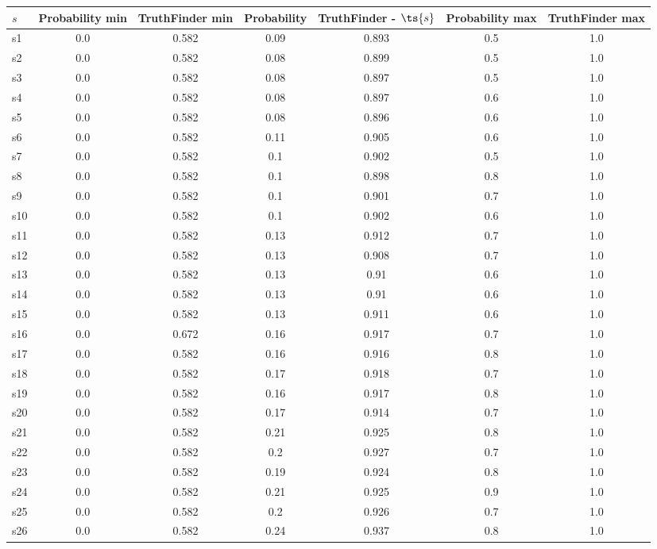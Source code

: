 \documentclass{article}
\begin{document}
\noindent\begin{tabular}{|l|c|c|c|c|c|c|}
\hline
$s$& Probability min & TruthFinder min & Probability & TruthFinder - $\ts{s}$ & Probability max & TruthFinder max\\
\hline
s1 &0.0 & 0.582 & 0.09 & 0.893 & 0.5 & 1.0\\
\hline
s2 &0.0 & 0.582 & 0.08 & 0.899 & 0.5 & 1.0\\
\hline
s3 &0.0 & 0.582 & 0.08 & 0.897 & 0.5 & 1.0\\
\hline
s4 &0.0 & 0.582 & 0.08 & 0.897 & 0.6 & 1.0\\
\hline
s5 &0.0 & 0.582 & 0.08 & 0.896 & 0.6 & 1.0\\
\hline
s6 &0.0 & 0.582 & 0.11 & 0.905 & 0.6 & 1.0\\
\hline
s7 &0.0 & 0.582 & 0.1 & 0.902 & 0.5 & 1.0\\
\hline
s8 &0.0 & 0.582 & 0.1 & 0.898 & 0.8 & 1.0\\
\hline
s9 &0.0 & 0.582 & 0.1 & 0.901 & 0.7 & 1.0\\
\hline
s10 &0.0 & 0.582 & 0.1 & 0.902 & 0.6 & 1.0\\
\hline
s11 &0.0 & 0.582 & 0.13 & 0.912 & 0.7 & 1.0\\
\hline
s12 &0.0 & 0.582 & 0.13 & 0.908 & 0.7 & 1.0\\
\hline
s13 &0.0 & 0.582 & 0.13 & 0.91 & 0.6 & 1.0\\
\hline
s14 &0.0 & 0.582 & 0.13 & 0.91 & 0.6 & 1.0\\
\hline
s15 &0.0 & 0.582 & 0.13 & 0.911 & 0.6 & 1.0\\
\hline
s16 &0.0 & 0.672 & 0.16 & 0.917 & 0.7 & 1.0\\
\hline
s17 &0.0 & 0.582 & 0.16 & 0.916 & 0.8 & 1.0\\
\hline
s18 &0.0 & 0.582 & 0.17 & 0.918 & 0.7 & 1.0\\
\hline
s19 &0.0 & 0.582 & 0.16 & 0.917 & 0.8 & 1.0\\
\hline
s20 &0.0 & 0.582 & 0.17 & 0.914 & 0.7 & 1.0\\
\hline
s21 &0.0 & 0.582 & 0.21 & 0.925 & 0.8 & 1.0\\
\hline
s22 &0.0 & 0.582 & 0.2 & 0.927 & 0.7 & 1.0\\
\hline
s23 &0.0 & 0.582 & 0.19 & 0.924 & 0.8 & 1.0\\
\hline
s24 &0.0 & 0.582 & 0.21 & 0.925 & 0.9 & 1.0\\
\hline
s25 &0.0 & 0.582 & 0.2 & 0.926 & 0.7 & 1.0\\
\hline
s26 &0.0 & 0.582 & 0.24 & 0.937 & 0.8 & 1.0\\

\end{tabular}
\end{document}
